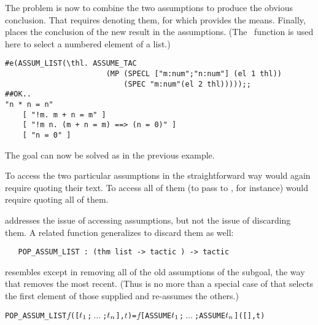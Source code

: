 \noindent The problem is now to combine the two assumptions to produce the
obvious conclusion. That requires denoting
 them, for which 
provides the means. Finally,
 places the conclusion of the new result in the assumptions.
(The \ML\ function  is used here to select a
numbered element of a list.)

\begin{session}\begin{verbatim}
#e(ASSUM_LIST(\thl. ASSUME_TAC
                       (MP (SPECL ["m:num";"n:num"] (el 1 thl))
                           (SPEC "m:num"(el 2 thl)))));;
##OK..
"n * n = n"
    [ "!m. m + n = m" ]
    [ "!m n. (m + n = m) ==> (n = 0)" ]
    [ "n = 0" ]
\end{verbatim}\end{session}

\noindent The goal can now be solved as in the previous example.

To access the
two particular assumptions in the straightforward way would again require quoting
their text. To access all of them (to pass to , for
instance) would require quoting all of them.

 addresses the issue of accessing assumptions,
but not the issue of discarding them.  A related function generalizes
 to discard them as well:

\begin{hol}\begin{verbatim}
   POP_ASSUM_LIST : (thm list -> tactic ) -> tactic
\end{verbatim}\end{hol}

\noindent {}
resembles  except in removing
all of the old assumptions of the subgoal, the way that 
removes the most recent.  (Thus  is no more than a special case
of  that selects the first element of those supplied
and re-assumes the others.)

\begin{hol}\begin{alltt}
   POP_ASSUM_LIST \(f\) ([\(t\sb{1}\);\(\ \ldots\ \);\(t\sb{n}\)],\(t\)) =  \(f\) [ASSUME \(t\sb{1}\);\(\ \ldots\ \);ASSUME \(t\sb{n}\)] ([],t)
\end{alltt}\end{hol}

